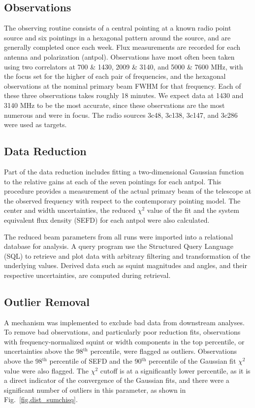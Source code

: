 \documentclass[preprint]{aastex}
\begin{document}
\subsection{Observations}\label{ss.observations}
The  observing routine consists of a central pointing at a known
radio point source and six pointings in a hexagonal pattern around the
source, and are generally completed once each week.  Flux measurements
are recorded for each antenna and polarization (antpol). Observations
have most often been taken using two correlators at 700 \& 1430, 2009
\& 3140, and 5000 \& 7600 MHz, with the focus set for the higher of
each pair of frequencies, and the hexagonal observations at the
nominal primary beam FWHM for that frequency.  Each of these three
observations takes roughly 18 minutes. We expect data at 1430 and 3140
MHz to be the most accurate, since these observations are the most
numerous and were in focus. The radio sources 3c48, 3c138, 3c147, and
3c286 were used as targets.

\subsection{Data Reduction}\label{ss.reduction}
Part of the data reduction includes fitting a two-dimensional Gaussian
function to the relative gains at each of the seven pointings for each
antpol.  This procedure provides a measurement of the actual primary
beam of the telescope at the observed frequency with respect to the
contemporary pointing model.  The center and width uncertainties, the
reduced $\chi^2$ value of the fit and the system equivalent flux
density (SEFD) for each antpol were also calculated.

The reduced beam parameters from all runs were imported into a
relational database for analysis.  A query program use the Structured
Query Language (SQL) to retrieve and plot data with arbitrary
filtering and transformation of the underlying values. Derived data
such as squint magnitudes and angles, and their respective
uncertainties, are computed during retrieval.

\subsection{Outlier Removal}\label{ss.outliers}
A mechanism was implemented to exclude bad data from downstream
analyses.  To remove bad observations, and particularly poor reduction
fits, observations with frequency-normalized squint or width
components in the top percentile, or uncertainties above the
98$^\textrm{th}$ percentile, were flagged as outliers.  Observations
above the 98$^\textrm{th}$ percentile of SEFD and the 90$^\textrm{th}$
percentile of the Gaussian fit $\chi^2$ value were also flagged.  The
$\chi^2$ cutoff is at a significantly lower percentile, as it is a
direct indicator of the convergence of the Gaussian fits, and there
were a significant number of outliers in this parameter, as shown in
Fig.~\ref{fig.dist_sumchisq}.
\end{document}
